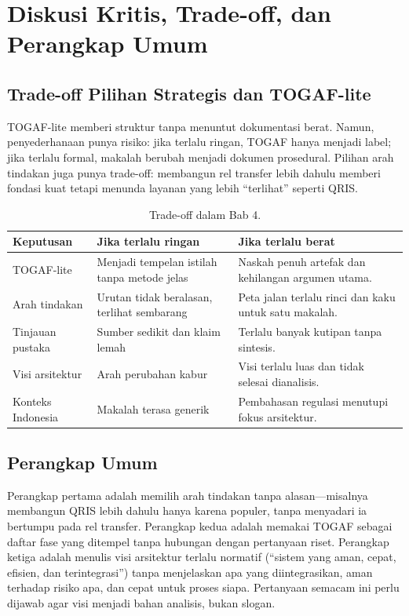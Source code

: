 \section{Diskusi Kritis, Trade-off, dan Perangkap Umum}

\subsection{Trade-off Pilihan Strategis dan TOGAF-lite}

TOGAF-lite memberi struktur tanpa menuntut dokumentasi berat. Namun,
penyederhanaan punya risiko: jika terlalu ringan, TOGAF hanya menjadi label;
jika terlalu formal, makalah berubah menjadi dokumen prosedural. Pilihan arah
tindakan juga punya trade-off: membangun rel transfer lebih dahulu memberi
fondasi kuat tetapi menunda layanan yang lebih ``terlihat'' seperti QRIS.

\begin{table}[htbp]
\centering
\scriptsize
\caption{Trade-off dalam Bab 4.}
\label{tab:tradeoff-bab3}
\begin{tabularx}{\textwidth}{@{}p{} X X@{}}
\hline
\textbf{Keputusan} & \textbf{Jika terlalu ringan} & \textbf{Jika terlalu berat} \\
\hline
TOGAF-lite & Menjadi tempelan istilah tanpa metode jelas & Naskah penuh artefak
dan kehilangan argumen utama. \\
Arah tindakan & Urutan tidak beralasan, terlihat sembarang & Peta jalan terlalu
rinci dan kaku untuk satu makalah. \\
Tinjauan pustaka & Sumber sedikit dan klaim lemah & Terlalu banyak kutipan
tanpa sintesis. \\
Visi arsitektur & Arah perubahan kabur & Visi terlalu luas dan tidak selesai
dianalisis. \\
Konteks Indonesia & Makalah terasa generik & Pembahasan regulasi menutupi fokus
arsitektur. \\
\hline
\end{tabularx}
\end{table}

\subsection{Perangkap Umum}

Perangkap pertama adalah memilih arah tindakan tanpa alasan---misalnya
membangun QRIS lebih dahulu hanya karena populer, tanpa menyadari ia bertumpu
pada rel transfer. Perangkap kedua adalah memakai TOGAF sebagai daftar fase yang
ditempel tanpa hubungan dengan pertanyaan riset. Perangkap ketiga adalah menulis
visi arsitektur terlalu normatif (``sistem yang aman, cepat, efisien, dan
terintegrasi'') tanpa menjelaskan apa yang diintegrasikan, aman terhadap risiko
apa, dan cepat untuk proses siapa. Pertanyaan semacam ini perlu dijawab agar
visi menjadi bahan analisis, bukan slogan.

